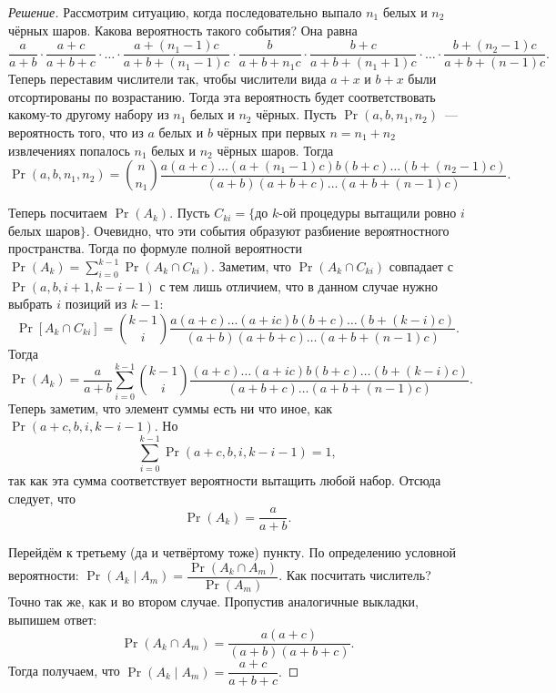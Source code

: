 \begin{proof}[Решение]
    Рассмотрим ситуацию, когда последовательно выпало \(n_1\) белых и \(n_2\) чёрных шаров. Какова вероятность такого события? Она равна \[\frac{a}{a + b}\cdot\frac{a + c}{a + b + c}\cdot\ldots\cdot\frac{a + (n_1 - 1)c}{a + b + (n_1 - 1)c}\cdot\frac{b}{a + b + n_1c}\cdot\frac{b + c}{a + b + (n_1 + 1)c}\cdot\ldots\cdot\frac{b + (n_2 - 1)c}{a + b + (n - 1)c}.\]
    Теперь переставим числители так, чтобы числители вида \(a + x\) и \(b + x\) были отсортированы по возрастанию. Тогда эта вероятность будет соответствовать какому-то другому набору из \(n_1\) белых и \(n_2\) чёрных. Пусть \(\Pr(a, b, n_1, n_2)\)~--- вероятность того, что из \(a\) белых и \(b\) чёрных при первых \(n = n_1 + n_2\) извлечениях попалось \(n_1\) белых и \(n_2\) чёрных шаров. Тогда
    \[\Pr(a, b, n_1, n_2) = \binom{n}{n_1}\frac{a(a + c)\ldots(a + (n_1 - 1)c)b(b + c)\ldots(b + (n_2 - 1)c)}{(a + b)(a + b + c)\ldots(a + b + (n - 1)c)}.\]
    
    Теперь посчитаем \(\Pr(A_k)\). Пусть \(C_{ki} = \{\)до \(k\)-ой процедуры вытащили ровно \(i\) белых шаров\(\}\). Очевидно, что эти события образуют разбиение вероятностного пространства. Тогда по формуле полной вероятности \(\Pr(A_k) = \sum\limits_{i = 0}^{k - 1} \Pr(A_k \cap C_{ki})\). Заметим, что \(\Pr(A_k \cap C_{ki})\) совпадает с \(\Pr(a, b, i + 1, k - i - 1)\) с тем лишь отличием, что в данном случае нужно выбрать \(i\) позиций из \(k - 1\): \[\Pr[A_k \cap C_{ki}] = \binom{k - 1}{i}\frac{a(a + c)\ldots(a + ic)b(b + c)\ldots(b + (k - i)c)}{(a + b)(a + b + c)\ldots(a + b + (n - 1)c)}.\] Тогда \[\Pr(A_k) = \frac{a}{a + b} \sum_{i = 0}^{k - 1} \binom{k - 1}{i}\frac{(a + c)\ldots(a + ic)b(b + c)\ldots(b + (k - i)c)}{(a + b + c)\ldots(a + b + (n - 1)c)}.\]
    Теперь заметим, что элемент суммы есть ни что иное, как \(\Pr(a + c, b, i, k - i - 1)\). Но \[\sum\limits_{i = 0}^{k - 1} \Pr(a + c, b, i, k - i - 1) = 1,\] так как эта сумма соответствует вероятности вытащить любой набор. Отсюда следует, что \[\Pr(A_k) = \dfrac{a}{a + b}.\]
    
    Перейдём к третьему (да и четвёртому тоже) пункту. По определению условной вероятности: \(\Pr(A_k \mid A_m) = \dfrac{\Pr(A_k \cap A_m)}{\Pr(A_m)}\). Как посчитать числитель? Точно так же, как и во втором случае. Пропустив аналогичные выкладки, выпишем ответ: \[\Pr(A_k \cap A_m) = \frac{a(a + c)}{(a + b)(a + b + c)}.\]
    Тогда получаем, что \(\Pr(A_k \mid A_m) = \dfrac{a + c}{a + b + c}.\)
\end{proof}

